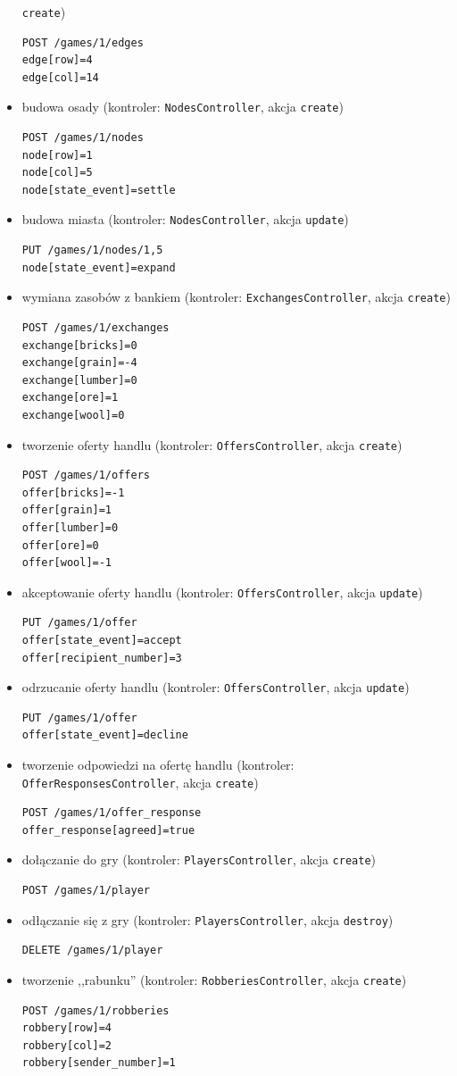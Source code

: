 \documentclass[11pt,twoside]{report}
\begin{document}
\begin{itemize}
  \texttt{create})
\begin{verbatim}
POST /games/1/edges
edge[row]=4
edge[col]=14
\end{verbatim}
\item budowa osady (kontroler: \texttt{NodesController}, akcja
  \texttt{create})
\begin{verbatim}
POST /games/1/nodes
node[row]=1
node[col]=5
node[state_event]=settle
\end{verbatim}
\item budowa miasta (kontroler: \texttt{NodesController}, akcja
  \texttt{update})
\begin{verbatim}
PUT /games/1/nodes/1,5
node[state_event]=expand
\end{verbatim}
\item wymiana zasobów z bankiem (kontroler: \texttt{ExchangesController}, akcja
  \texttt{create})
\begin{verbatim}
POST /games/1/exchanges
exchange[bricks]=0
exchange[grain]=-4
exchange[lumber]=0
exchange[ore]=1
exchange[wool]=0
\end{verbatim}
\item tworzenie oferty handlu (kontroler: \texttt{OffersController},
  akcja \texttt{create})
\begin{verbatim}
POST /games/1/offers
offer[bricks]=-1
offer[grain]=1
offer[lumber]=0
offer[ore]=0
offer[wool]=-1
\end{verbatim}
\item akceptowanie oferty handlu (kontroler:
  \texttt{OffersController}, akcja \texttt{update})
\begin{verbatim}
PUT /games/1/offer
offer[state_event]=accept
offer[recipient_number]=3
\end{verbatim}
\item odrzucanie oferty handlu (kontroler: \texttt{OffersController},
  akcja \texttt{update})
\begin{verbatim}
PUT /games/1/offer
offer[state_event]=decline
\end{verbatim}
\item tworzenie odpowiedzi na ofertę handlu (kontroler:
  \texttt{OfferResponsesController}, akcja \texttt{create})
\begin{verbatim}
POST /games/1/offer_response
offer_response[agreed]=true
\end{verbatim}
\item dołączanie do gry (kontroler: \texttt{PlayersController}, akcja
  \texttt{create})
\begin{verbatim}
POST /games/1/player
\end{verbatim}
\item odłączanie się z gry (kontroler: \texttt{PlayersController}, akcja
  \texttt{destroy})
\begin{verbatim}
DELETE /games/1/player
\end{verbatim}
\item tworzenie ,,rabunku'' (kontroler: \texttt{RobberiesController}, akcja
  \texttt{create})
\begin{verbatim}
POST /games/1/robberies
robbery[row]=4
robbery[col]=2
robbery[sender_number]=1
\end{verbatim}
\end{itemize}
\end{document}

